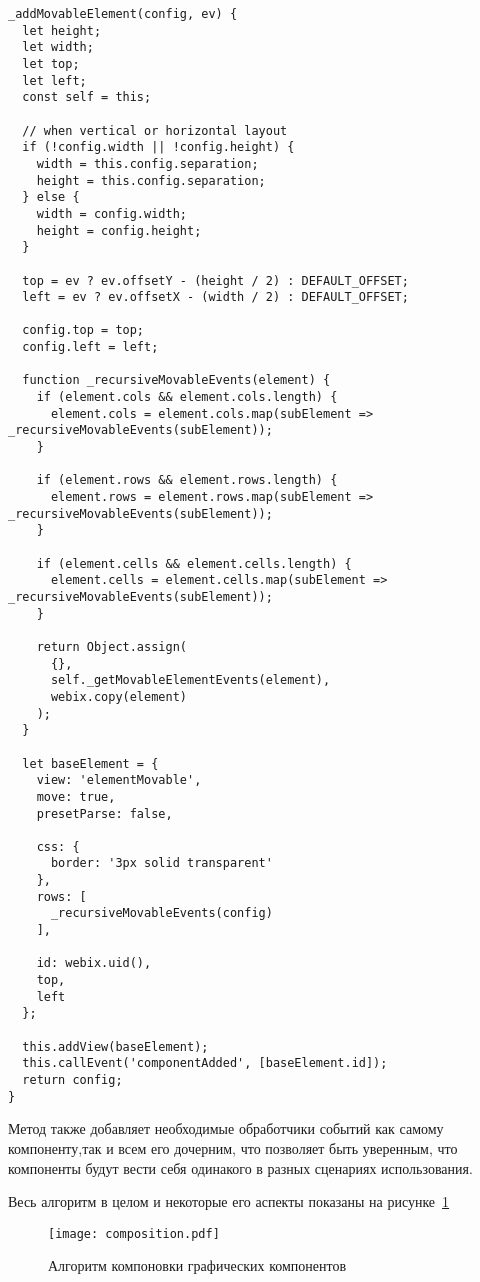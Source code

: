 \begin{lstlisting}
_addMovableElement(config, ev) {
  let height;
  let width;
  let top;
  let left;
  const self = this;

  // when vertical or horizontal layout
  if (!config.width || !config.height) {
    width = this.config.separation;
    height = this.config.separation;
  } else {
    width = config.width;
    height = config.height;
  }

  top = ev ? ev.offsetY - (height / 2) : DEFAULT_OFFSET;
  left = ev ? ev.offsetX - (width / 2) : DEFAULT_OFFSET;

  config.top = top;
  config.left = left;

  function _recursiveMovableEvents(element) {
    if (element.cols && element.cols.length) {
      element.cols = element.cols.map(subElement => _recursiveMovableEvents(subElement));
    }

    if (element.rows && element.rows.length) {
      element.rows = element.rows.map(subElement => _recursiveMovableEvents(subElement));
    }

    if (element.cells && element.cells.length) {
      element.cells = element.cells.map(subElement => _recursiveMovableEvents(subElement));
    }

    return Object.assign(
      {},
      self._getMovableElementEvents(element),
      webix.copy(element)
    );
  }

  let baseElement = {
    view: 'elementMovable',
    move: true,
    presetParse: false,

    css: {
      border: '3px solid transparent'
    },
    rows: [
      _recursiveMovableEvents(config)
    ],

    id: webix.uid(),
    top,
    left
  };

  this.addView(baseElement);
  this.callEvent('componentAdded', [baseElement.id]);
  return config;
}
\end{lstlisting}

Метод также добавляет необходимые обработчики событий как самому компоненту,так и всем его дочерним, что позволяет быть уверенным, что компоненты будут вести себя одинакого в разных сценариях использования.

Весь алгоритм в целом и некоторые его аспекты показаны на рисунке~\ref{sec:dev:composition}\pagebreak

\begin{figure}[ht]
  \centering
    \texttt{[image: composition.pdf]}
    \caption{Алгоритм компоновки графических компонентов}
    \label{sec:dev:composition}
\end{figure}